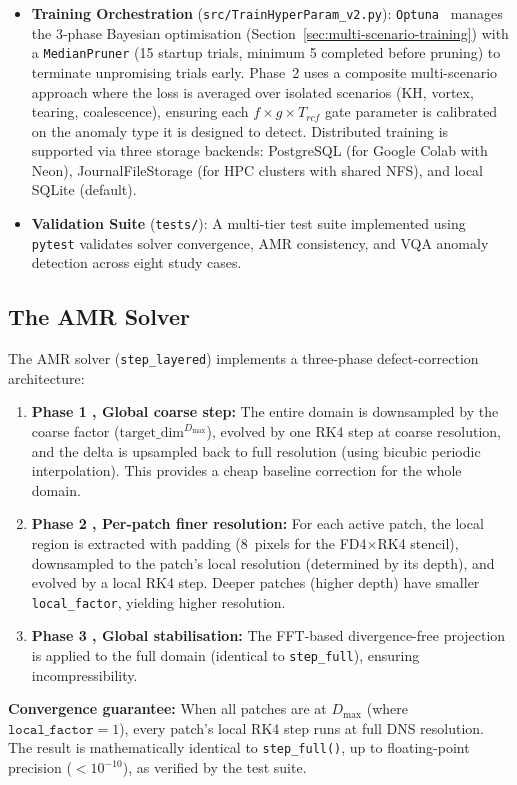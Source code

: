 \documentclass[12pt, a4paper, oneside]{report}
\begin{document}
\begin{itemize}
    Quantum circuits are constructed with \texttt{Qiskit}~\cite{qiskit2024} and executed on the \texttt{Qiskit-Aer} statevector simulator. The code also supports execution on IBM's \texttt{FakeFez} noisy simulator and, when available, on real IBM quantum hardware via the \texttt{--mode hardware} command-line flag with dynamical decoupling and gate twirling for error mitigation.
    \item \textbf{Training Orchestration} (\texttt{src/TrainHyperParam\_v2.py}): \texttt{Optuna}~\cite{akiba2019} manages the 3-phase Bayesian optimisation (Section~\ref{sec:multi-scenario-training}) with a \texttt{MedianPruner} (15 startup trials, minimum 5 completed before pruning) to terminate unpromising trials early. Phase~2 uses a composite multi-scenario approach where the loss is averaged over isolated scenarios (KH, vortex, tearing, coalescence), ensuring each $f \times g \times T_{rcf}$ gate parameter is calibrated on the anomaly type it is designed to detect. Distributed training is supported via three storage backends: PostgreSQL (for Google Colab with Neon), JournalFileStorage (for HPC clusters with shared NFS), and local SQLite (default).
    \item \textbf{Validation Suite} (\texttt{tests/}): A multi-tier test suite implemented using \texttt{pytest} validates solver convergence, AMR consistency, and VQA anomaly detection across eight study cases.
\end{itemize}

\subsection{The AMR Solver}

The AMR solver (\texttt{step\_layered}) implements a three-phase defect-correction architecture:
\begin{enumerate}
    \item \textbf{Phase 1 ,  Global coarse step:} The entire domain is downsampled by the coarse factor ($\text{target\_dim}^{D_{\max}}$), evolved by one RK4 step at coarse resolution, and the delta is upsampled back to full resolution (using bicubic periodic interpolation). This provides a cheap baseline correction for the whole domain.
    \item \textbf{Phase 2 ,  Per-patch finer resolution:} For each active patch, the local region is extracted with padding (8~pixels for the FD4$\times$RK4 stencil), downsampled to the patch's local resolution (determined by its depth), and evolved by a local RK4 step. Deeper patches (higher depth) have smaller \texttt{local\_factor}, yielding higher resolution.
    \item \textbf{Phase 3 ,  Global stabilisation:} The FFT-based divergence-free projection is applied to the full domain (identical to \texttt{step\_full}), ensuring incompressibility.
\end{enumerate}
\textbf{Convergence guarantee:} When all patches are at $D_{\max}$ (where $\texttt{local\_factor} = 1$), every patch's local RK4 step runs at full DNS resolution. The result is mathematically identical to \texttt{step\_full()}, up to floating-point precision ($< 10^{-10}$), as verified by the test suite.
\end{document}
